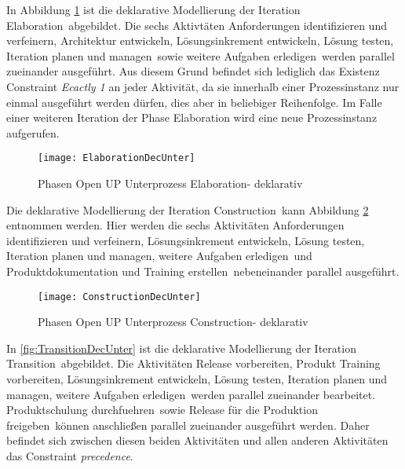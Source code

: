 In Abbildung \ref{fig:ElaborationDecUnter} ist die deklarative Modellierung der Iteration \grqq Elaboration\grqq \  abgebildet. Die sechs Aktivtäten \grqq Anforderungen identifizieren und verfeinern\grqq, \grqq Architektur entwickeln\grqq, \grqq Lösungsinkrement entwickeln\grqq, \grqq Lösung testen\grqq, \grqq Iteration planen und managen\grqq \ sowie \grqq weitere Aufgaben erledigen\grqq \ werden parallel zueinander ausgeführt. Aus diesem Grund befindet sich lediglich das Existenz Constraint \textit{Ecactly 1} an jeder Aktivität, da sie innerhalb einer Prozessinstanz nur einmal ausgeführt werden dürfen, dies aber in beliebiger Reihenfolge. Im Falle einer weiteren Iteration der Phase Elaboration wird eine neue Prozessinstanz aufgerufen. \newline

\begin{figure}[htp]
\begin{center}
  \texttt{[image: ElaborationDecUnter]} %
  \caption{Phasen Open UP Unterprozess Elaboration- deklarativ} 
  \label{fig:ElaborationDecUnter}
\end{center}
\end{figure}

Die deklarative Modellierung der Iteration \grqq Construction\grqq \  kann Abbildung \ref{fig:ConstructionDecUnter} entnommen werden. Hier werden die sechs Aktivitäten \grqq Anforderungen identifizieren und verfeinern\grqq, \grqq Lösungsinkrement entwickeln\grqq, \grqq Lösung testen\grqq, \grqq Iteration planen und managen\grqq, \grqq weitere Aufgaben erledigen\grqq \ und \grqq Produktdokumentation und Training erstellen\grqq \ nebeneinander parallel ausgeführt.
\begin{figure}[htp]
\begin{center}
  \texttt{[image: ConstructionDecUnter]} %
  \caption{Phasen Open UP Unterprozess Construction- deklarativ}
  \label{fig:ConstructionDecUnter}
\end{center}
\end{figure}

In \ref{fig:TransitionDecUnter} ist die deklarative Modellierung der Iteration \grqq Transition\grqq \  abgebildet.\newline
Die Aktivitäten \grqq Release vorbereiten\grqq, \grqq Produkt Training vorbereiten\grqq, \grqq Lösungsinkrement entwickeln\grqq, \grqq Lösung testen\grqq, \grqq Iteration planen und managen\grqq, \grqq weitere Aufgaben erledigen\grqq \ werden parallel zueinander bearbeitet. \grqq Produktschulung durchfuehren\grqq \   sowie \grqq Release für die Produktion freigeben\grqq \  können anschließen parallel zueinander ausgeführt werden. Daher befindet sich zwischen diesen beiden Aktivitäten und allen anderen Aktivitäten das Constraint \textit{precedence}.

